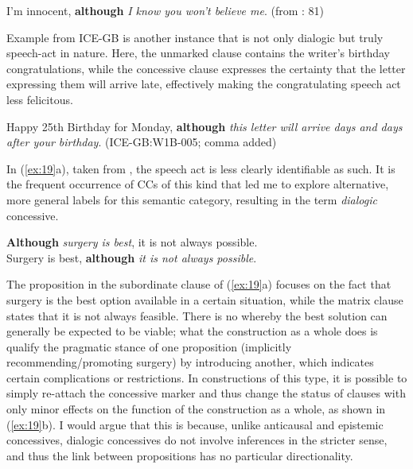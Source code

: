 \ea\label{ex:17}\label{bkm:Ref427151328}I’m innocent, \textbf{although} \textit{I know you won’t believe me}. (from \citealt{Sweetser1990}: 81)\\
\z

Example  from ICE-GB is another instance that is not only dialogic but truly speech-act in nature. Here, the unmarked clause contains the writer’s birthday congratulations, while the concessive clause expresses the certainty that the letter expressing them will arrive late, effectively making the congratulating speech act less felicitous.

\ea\label{ex:18}\label{bkm:Ref427151342}Happy 25th Birthday for Monday, \textbf{although} \textit{this letter will arrive days and days after your birthday}. (ICE-GB:W1B-005; comma added)\\
\z

In (\ref{ex:19}a), taken from \citet[165]{Hilpert2013a}, the speech act is less clearly identifiable as such. It is the frequent occurrence of CCs of this kind that led me to explore alternative, more general labels for this semantic category, resulting in the term \textit{dialogic} concessive.

\ea\label{ex:19}
    \ea\label{ex:19a}\label{bkm:Ref427151356}\textbf{Although} \textit{surgery is best}, it is not always possible. \citep[165]{Hilpert2013a}\\
    \ex\label{ex:19b}Surgery is best, \textbf{although} \textit{it is not always possible}.\\
\z
\z

The proposition in the subordinate clause of (\ref{ex:19}a) focuses on the fact that surgery is the best option available in a certain situation, while the matrix clause states that it is not always feasible. There is no  whereby the best solution can generally be expected to be viable; what the construction as a whole does is qualify the pragmatic stance of one proposition (implicitly recommending/promoting surgery) by introducing another, which indicates certain complications or restrictions. In constructions of this type, it is possible to simply re-attach the concessive marker and thus change the status of clauses with only minor effects on the function of the construction as a whole, as shown in (\ref{ex:19}b). I would argue that this is because, unlike anticausal and epistemic concessives, dialogic concessives do not involve inferences in the stricter sense, and thus the link between propositions has no particular directionality.

